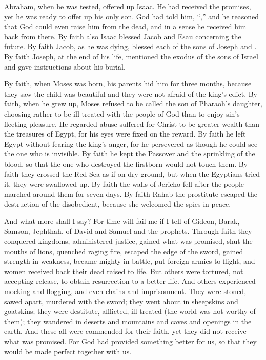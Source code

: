 {Abraham,
when
he was tested,
offered up
Isaac.
He had received
the promises,
yet
he was ready to offer up
his only son.
God
had told
him, “{},”
and
he reasoned
that
God
could
even raise
him from
the dead,
and
in
a sense
he received
him
back
from there.
By faith
also
Isaac
blessed
Jacob
and
Esau
concerning
the future.
By faith
Jacob,
as he was dying,
blessed
each
of the sons
of Joseph
and
{}.
By faith
Joseph,
at the end of
his life,
mentioned
the exodus
of the sons
of Israel
and
gave instructions
about
his
burial.
\par }{\PP {}By faith,
when Moses
was born,
his
parents
hid
him for three months,
because
they saw
the child
was beautiful
and
they were
not
afraid
of the king’s
edict.
By faith,
when he grew up,
Moses
refused
to be called
the son
of Pharaoh’s
daughter,
choosing
rather
to be ill-treated
with the people
of God
than
to enjoy
sin’s
fleeting pleasure.
He regarded
abuse suffered
for Christ
to be greater
wealth
than
the treasures
of Egypt,
for
his eyes were fixed
on
the reward.
By faith
he left
Egypt
without
fearing
the king’s
anger,
for
he persevered
as though
he could see
the one who is invisible.
By faith
he kept
the Passover
and
the sprinkling
of the blood,
so that
the one who destroyed
the firstborn
would
not
touch
them.
By faith
they crossed
the Red
Sea
as
if on
dry
ground,
but when the Egyptians
tried
it, they were swallowed up.
By faith
the walls
of Jericho
fell
after the people marched around
them for
seven
days.
By faith
Rahab
the prostitute
escaped the destruction
of the disobedient,
because she welcomed
the spies
in
peace.
\par }{\PP {}And
what
more
shall I say? For
time
will fail
me
if I tell
of
Gideon,
Barak,
Samson,
Jephthah,
of David
and
Samuel
and
the prophets.
Through
faith
they conquered
kingdoms,
administered
justice,
gained
what was promised,
shut
the mouths
of lions,
quenched
raging
fire,
escaped
the edge
of
the sword,
gained strength
in
weakness,
became
mighty
in
battle,
put
foreign
armies
to flight,
and women
received back
their
dead
raised to life.
But
others
were tortured,
not
accepting
release,
to obtain
resurrection
to
a better life.
And
others
experienced
mocking
and
flogging,
and
even
chains
and
imprisonment.
They were stoned,
sawed apart,
murdered
with
the sword;
they went about
in
sheepskins
and goatskins;
they were destitute,
afflicted,
ill-treated
(the world
was
not
worthy
of them); they wandered
in
deserts
and
mountains
and
caves
and
openings
in the earth.
And
these
all
were commended
for
their faith,
yet they did
not
receive
what was promised.
For God
had provided
something
better
for
us,
so that
they would be made perfect
together with
us.

}
